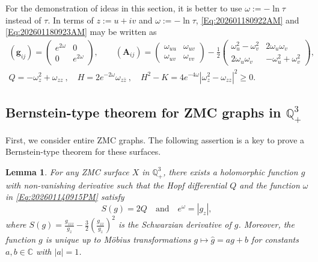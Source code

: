 \documentclass[12pt,reqno]{amsart}
\theoremstyle{plain} %
\newtheorem{lemma}[theorem]{Lemma}
\theoremstyle{definition}
\numberwithin{equation}{section}
\newcommand{\qthreep}{\mathbb{Q}^3_+}
\begin{document}
For the demonstration of ideas in this section, it is better to use $\omega := -\ln \tau$ instead of $\tau$.
In terms of $z:=u+iv$ and $\omega := -\ln \tau$, \eqref{Eq:202601180922AM} and \eqref{Eq:202601180923AM} may be written as
\begin{gather}
	\label{Eq:202601140915PM}
	(\mathbf{g}_{ij})  = \begin{pmatrix} e^{2\omega} & 0 \\ 0 & e^{2\omega} \end{pmatrix}, \qquad
	(\mathbf{A}_{ij})  = \begin{pmatrix} \omega_{uu} & \omega_{uv} \\ \omega_{uv} & \omega_{vv} \end{pmatrix}
	- \frac{1}{2} \begin{pmatrix} \omega_{u}^2-\omega_v^2 & 2\omega_u \omega_v \\ 2\omega_u \omega_v & -\omega_{u}^2+\omega_v^2 \end{pmatrix},
	\\
	\label{Eq:202507101519}
	Q = -\omega^2_z+\omega_{zz}\ ,\quad
	H = 2 e^{-2\omega} \omega_{z\bar{z}}\ ,\quad
	H^2-K=4 e^{-4\omega}|\omega^2_z-\omega_{zz}|^2\ge0.
\end{gather}

\subsection{Bernstein-type theorem for ZMC graphs in $\qthreep$}\label{Sec:3.2}

First, we consider entire ZMC graphs. The following assertion is a key to prove a Bernstein-type theorem for these surfaces.

\begin{lemma}\label{lemma:Schwarzian_ZMC}
	For any ZMC surface $X$ in $\qthreep$, there exists a holomorphic function $g$ with non-vanishing derivative such that the Hopf differential $Q$ and the function $\omega$ in \eqref{Eq:202601140915PM} satisfy
	\begin{equation}\label{eq:S(g)}
		S(g) =2Q\quad \text{and} \quad e^\omega = |g_z|,
	\end{equation}
	where $S(g)=\frac{g_{zzz}}{g_z}-\frac{3}{2}\left(\frac{g_{zz}}{g_z}\right)^2$ is the Schwarzian derivative of $g$.
	Moreover, the function $g$ is unique up to M\"obius transformations $g \mapsto \hat{g}=ag+b$ for constants $a,b \in \mathbb{C}$ with $|a|=1$.
\end{lemma}
\end{document}
